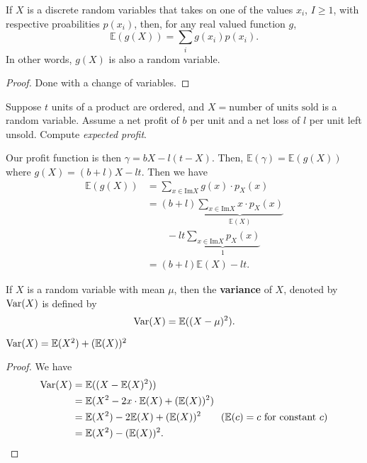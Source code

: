 
\begin{prop}
	If \( X \) is a discrete random variables that takes on one of the values \( x_i \), \( I\ge 1 \), with respective proabilities \( p(x_i) \), then, for any real valued function \( g \), \[
		\mathbb{E}(g(X)) = \sum_{i} g(x_i)p(x_i)
	.\] In other words, \( g(X) \) is also a random variable.
\end{prop}
\begin{proof}
	Done with a change of variables.
\end{proof}

\begin{eg}
	Suppose \( t \) units of a product are ordered, and \( X = \text{number of units sold} \) is a random variable. Assume a net profit of \( b \) per unit and a net loss of \( l \) per unit left unsold. Compute \textit{expected profit}.
\end{eg}
\begin{explanation}
	Our profit function is then \( \gamma = bX - l(t-X) \). Then, \( \mathbb{E}(\gamma ) = \mathbb{E}(g(X)) \) where \( g(X) = (b+l)X - lt \). Then we have
	\begin{align*}
		\mathbb{E}(g(X)) &= \sum_{x \in \text{Im}X} g(x) \cdot p_X(x) \\
										 &= (b+l)\underbrace{\sum_{x \in \text{Im}X} x \cdot p_X(x)}_{\mathbb{E}(X)} \\ & \qquad - lt \underbrace{\sum_{x \in \text{Im}X} p_X(x)}_{1}\\ 
		&= (b+l)\mathbb{E}(X) - lt
	.\end{align*}
\end{explanation}

\begin{definition}
	If \( X \) is a random variable with mean \( \mu  \), then the \textbf{variance} of \( X \), denoted by \( \operatorname{Var}(X) \) is defined by \[
		\operatorname{Var}(X) = \mathbb{E}((X - \mu )^{2} )
	.\] 
\end{definition}

\begin{prop}
	\( \operatorname{Var}(X) = \mathbb{E}(X^{2} ) + (\mathbb{E}(X))^{2} \)
\end{prop}
\begin{proof}
	We have 
	\begin{align*}
		\Var(X) &= \mathbb{E}((X - \mathbb{E}(X)^{2})) \\
						&= \mathbb{E}(X^{2} - 2x\cdot \mathbb{E}(X) + (\mathbb{E}(X))^{2}   ) \\
						&= \mathbb{E}(X^{2} ) - 2 \mathbb{E}(X) + (\mathbb{E}(X))^{2} \tag{\( \mathbb{E}(c) = c \) for constant \( c \)} \\
						&= \mathbb{E}(X^{2} ) - (\mathbb{E}(X))^{2}
	.\end{align*}
\end{proof}

